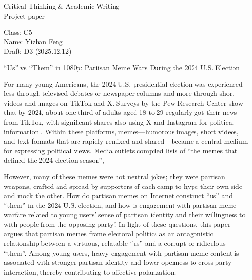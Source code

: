 \documentclass[12pt,twoside]{article}
\begin{document}
{\fontsize{16}{35}\selectfont
Critical Thinking \& Academic Writing\\
Project paper\par
}

\vspace{-0.5\baselineskip}

Class: C5 \\
Name: Yizhan Feng \\
Draft: D3 (2025.12.12) \\

\vspace{-0.75\baselineskip}

\begin{center}
{\fontsize{14}{17}\selectfont
``Us'' vs ``Them'' in 1080p: Partisan Meme Wars During the 2024 U.S. Election\par
}
\end{center}

\vspace{-\baselineskip}


For many young Americans, the 2024 U.S. presidential election was experienced less through televised debates or newspaper columns and more through short videos and images on TikTok and X. Surveys by the Pew Research Center show that by 2024, about one-third of adults aged 18 to 29 regularly got their news from TikTok, with significant shares also using X and Instagram for political information \parencite{shearer2024newsTikTokXFacebookInstagram}. Within these platforms, memes---humorous images, short videos, and text formats that are rapidly remixed and shared---became a central medium for expressing political views. Media outlets compiled lists of ``the memes that defined the 2024 election season'',

However, many of these memes were not neutral jokes; they were partisan weapons, crafted and spread by supporters of each camp to hype their own side and mock the other. How do partisan memes on Internet construct ``us'' and ``them'' in the 2024 U.S. election, and how is engagement with partisan meme warfare related to young users' sense of partisan identity and their willingness to with people from the opposing party? In light of these questions, this paper argues that partisan memes frame electoral politics as an antagonistic relationship between a virtuous, relatable ``us'' and a corrupt or ridiculous “them”. Among young users, heavy engagement with partisan meme content is associated with stronger partisan identity and lower openness to cross-party interaction, thereby contributing to affective polarization. 
\end{document}
